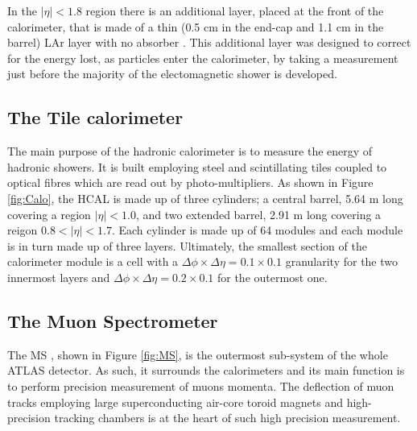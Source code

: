  				In the $\left | \eta\right | < 1.8$ region there is an additional layer, placed at the front of the calorimeter, that is made of a thin (0.5 cm in the end-cap and 1.1 cm in the barrel) LAr layer with no absorber \cite{ATLASLAR}. This additional layer was designed to correct for the energy lost, as particles enter the calorimeter, by taking a measurement just before the majority of the electomagnetic shower is developed.


			\subsection*{The Tile calorimeter}

				The main purpose of the hadronic calorimeter is to measure the energy of hadronic showers. It is built employing steel and scintillating tiles coupled to optical fibres which are read out by photo-multipliers. As shown in Figure \ref{fig:Calo}, the HCAL is made up of three cylinders; a central barrel, 5.64 m long covering a region $\left | \eta \right | < 1.0$, and two extended barrel, 2.91 m long covering a reigon $0.8 < \left | \eta \right | < 1.7$. Each cylinder is made up of 64 modules and each module is in turn made up of three layers. Ultimately, the smallest section of the calorimeter module is a cell with a $\Delta \phi \times \Delta \eta = 0.1 \times 0.1$ granularity for the two innermost layers and $\Delta \phi \times \Delta \eta = 0.2 \times 0.1$ for the outermost one. 

		\subsection{The Muon Spectrometer}
		\label{sec:MuSpec}

			The MS \cite{MSTDR}, shown in Figure \ref{fig:MS}, is the outermost sub-system of the whole ATLAS detector. As such, it surrounds the calorimeters and its main function is to perform precision measurement of muons momenta. The deflection of muon tracks employing large superconducting air-core toroid magnets and high-precision tracking chambers is at the heart of such high precision measurement. 

